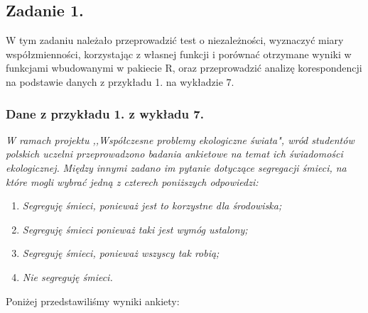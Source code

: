 \documentclass[12pt]{mwart}
\begin{document}
\subsection{Zadanie 1.}\label{section:3.1}
W tym zadaniu należało przeprowadzić test o niezależności, wyznaczyć miary współzmienności, korzystając z własnej funkcji i porównać otrzymane wyniki w funkcjami wbudowanymi w pakiecie R,  oraz przeprowadzić analizę korespondencji na podstawie danych z przykładu 1. na wykładzie 7.
\subsubsection{Dane z przykładu 1. z wykładu 7.}
\emph{W ramach projektu ,,Współczesne problemy ekologiczne świata", wród studentów polskich uczelni przeprowadzono badania ankietowe na temat ich świadomości ekologicznej.}\newline\noindent
\emph{Między innymi zadano im pytanie dotyczące segregacji śmieci, na które mogli wybrać jedną z czterech poniższych odpowiedzi:}
\begin{enumerate}[label=(\Alph*)]
	\item \emph{Segreguję śmieci, ponieważ jest to korzystne dla środowiska;}
	\item \emph{Segreguję śmieci ponieważ taki jest wymóg ustalony;}
	\item \emph{Segreguję śmieci, ponieważ wszyscy tak robią;}
	\item \emph{Nie segreguję śmieci.}
\end{enumerate}
Poniżej przedstawiliśmy wyniki ankiety:
\end{document}
